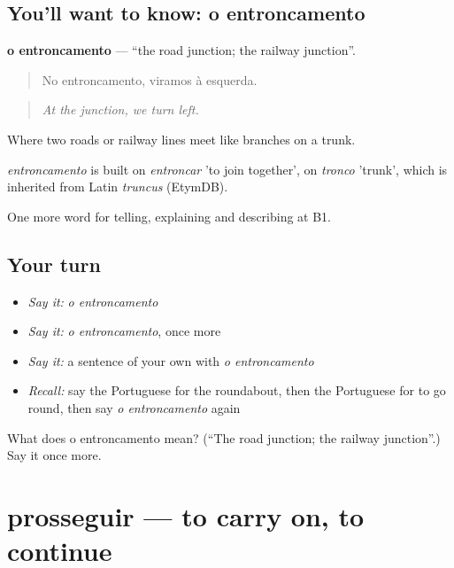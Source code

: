 \subsection*{You'll want to know: o entroncamento}
\textbf{o entroncamento} — \textquotedblleft{}the road junction; the railway junction\textquotedblright{}.

\begin{quote}
No entroncamento, viramos à esquerda.
\end{quote}

\begin{quote}
\emph{At the junction, we turn left.}
\end{quote}

Where two roads or railway lines meet like branches on a trunk.

\begin{cousinweb}
\emph{entroncamento} is built on \emph{entroncar} 'to join together', on \emph{tronco} 'trunk', which is inherited from Latin \emph{truncus} (EtymDB).
\end{cousinweb}

\begin{grammarlens}[title={What you've built}]
One more word for telling, explaining and describing at B1.
\end{grammarlens}

\subsection*{Your turn}
\begin{itemize}
\raggedright
  \item \emph{Say it:} \emph{o entroncamento}
  \item \emph{Say it:} \emph{o entroncamento}, once more
  \item \emph{Say it:} a sentence of your own with \emph{o entroncamento}
  \item \emph{Recall:} say the Portuguese for the roundabout, then the Portuguese for to go round, then say \emph{o entroncamento} again
\end{itemize}

\begin{tcolorbox}[breakable,colback=teal!4,colframe=teal!35!black,title={Before you move on}]
What does o entroncamento mean? (\textquotedblleft{}The road junction; the railway junction\textquotedblright{}.) Say it once more.
\end{tcolorbox}
\section[prosseguir]{prosseguir — to carry on, to continue}

